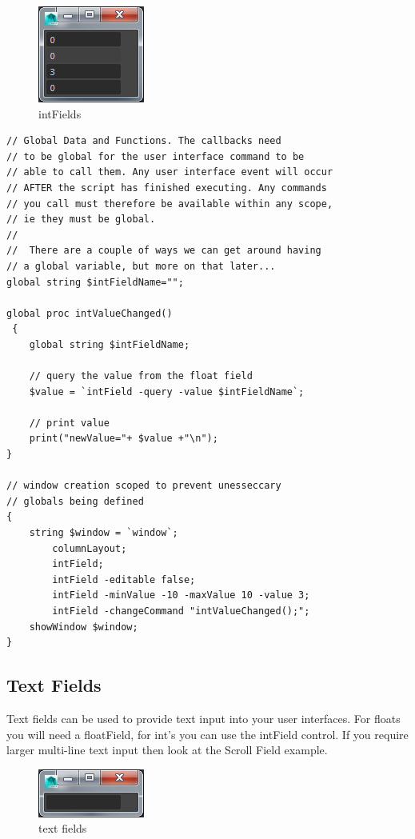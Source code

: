 \begin{figure}[tbh]
	\centering
	\includegraphics[width=0.2\linewidth]{figures/GUI/intFields}
	\caption{intFields}
	\label{fig:intfields}
\end{figure}

\begin{lstlisting}
// Global Data and Functions. The callbacks need
// to be global for the user interface command to be 
// able to call them. Any user interface event will occur
// AFTER the script has finished executing. Any commands
// you call must therefore be available within any scope,
// ie they must be global. 
// 
//	There are a couple of ways we can get around having 
// a global variable, but more on that later...
global string $intFieldName=""; 

global proc intValueChanged()
 {
	global string $intFieldName;
	
	// query the value from the float field
	$value = `intField -query -value $intFieldName`;
	
	// print value
	print("newValue="+ $value +"\n");
}

// window creation scoped to prevent unesseccary
// globals being defined
{
	string $window = `window`;
		columnLayout;
		intField;
		intField -editable false;
		intField -minValue -10 -maxValue 10 -value 3;
		intField -changeCommand "intValueChanged();";
	showWindow $window;
}
\end{lstlisting}

\subsection{Text Fields}
Text fields can be used to provide text input into your user interfaces. For floats you will need a floatField, for int's you can use the intField control. If you require larger multi-line text input then look at the Scroll Field example.

\begin{figure}[tbh]
	\centering
	\includegraphics[width=0.2\linewidth]{figures/GUI/textField}
	\caption{text fields}
	\label{fig:textfield}
\end{figure}


